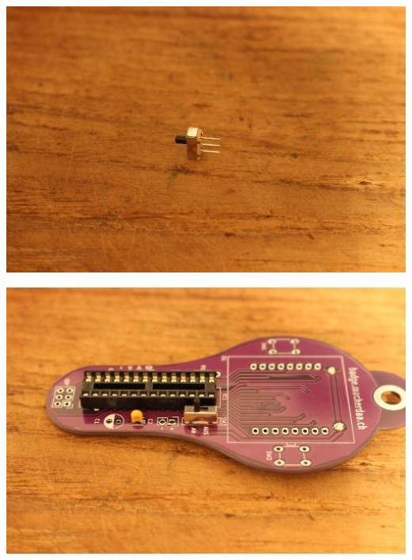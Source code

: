 \documentclass{article}
\begin{document}
\begin{minipage}[b]{0.5\textwidth}
	\includegraphics[width=\textwidth]{Bilder2024/IMG_0054.JPG}
\end{minipage}
\begin{minipage}[b]{0.5\textwidth}
	\includegraphics[width=\textwidth]{Bilder2024/IMG_0055.JPG}
\end{minipage}

\vspace{0.5cm}
\end{document}
